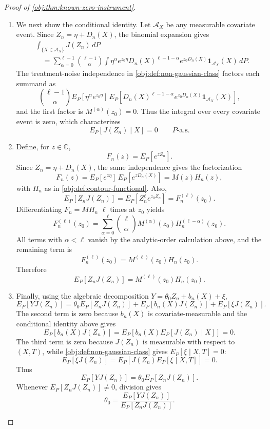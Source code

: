 \documentclass[11pt]{article}
\begin{document}
\begin{proof}[Proof of \cref{obj:thm:known-zero-instrument}]
\begin{enumerate}
\item We next show the conditional identity. Let \(\mathcal A_X\) be any measurable covariate event. Since \(Z_n=\eta+D_n(X)\), the binomial expansion gives
\[
\begin{aligned}
&\int_{\{X\in\mathcal A_X\}} J(Z_n)\,dP  \\
&\quad =
\sum_{\alpha=0}^{\ell-1}
\binom{\ell-1}{\alpha}
\int
\eta^\alpha e^{z_0\eta}
D_n(X)^{\ell-1-\alpha}e^{z_0D_n(X)}
\mathbf 1_{\mathcal A_X}(X)\,dP .
\end{aligned}
\]
The treatment-noise independence in \cref{obj:def:non-gaussian-class} factors each summand as
\[
\binom{\ell-1}{\alpha}
E_P\!\left[\eta^\alpha e^{z_0\eta}\right]\,
E_P\!\left[
D_n(X)^{\ell-1-\alpha}e^{z_0D_n(X)}
\mathbf 1_{\mathcal A_X}(X)
\right],
\]
and the first factor is \(M^{(\alpha)}(z_0)=0\). Thus the integral over every covariate event is zero, which characterizes
\[
E_P[J(Z_n)\mid X]=0
\qquad P\text{-a.s.}
\]

\item Define, for \(z\in\mathbb C\),
\[
F_n(z)=E_P[e^{zZ_n}].
\]
Since \(Z_n=\eta+D_n(X)\), the same independence gives the factorization
\[
F_n(z)=E_P[e^{z\eta}]\,E_P[e^{zD_n(X)}]=M(z)H_n(z),
\]
with \(H_n\) as in \cref{obj:def:contour-functional}. Also,
\[
E_P[Z_nJ(Z_n)]
=
E_P[Z_n^\ell e^{z_0Z_n}]
=
F_n^{(\ell)}(z_0).
\]
Differentiating \(F_n=MH_n\) \(\ell\) times at \(z_0\) yields
\[
F_n^{(\ell)}(z_0)
=
\sum_{\alpha=0}^{\ell}
\binom{\ell}{\alpha}
M^{(\alpha)}(z_0)H_n^{(\ell-\alpha)}(z_0).
\]
All terms with \(\alpha<\ell\) vanish by the analytic-order calculation above, and the remaining term is
\[
F_n^{(\ell)}(z_0)=M^{(\ell)}(z_0)H_n(z_0).
\]
Therefore
\[
E_P[Z_nJ(Z_n)]
=
M^{(\ell)}(z_0)H_n(z_0).
\]

\item Finally, using the algebraic decomposition \(Y=\theta_0Z_n+b_n(X)+\xi\),
\[
E_P[YJ(Z_n)]
=
\theta_0E_P[Z_nJ(Z_n)]
+
E_P[b_n(X)J(Z_n)]
+
E_P[\xi J(Z_n)] .
\]
The second term is zero because \(b_n(X)\) is covariate-measurable and the conditional identity above gives
\[
E_P[b_n(X)J(Z_n)]
=
E_P\!\left[b_n(X)E_P[J(Z_n)\mid X]\right]
=0 .
\]
The third term is zero because \(J(Z_n)\) is measurable with respect to \((X,T)\), while \cref{obj:def:non-gaussian-class} gives \(E_P[\xi\mid X,T]=0\):
\[
E_P[\xi J(Z_n)]
=
E_P\!\left[J(Z_n)E_P[\xi\mid X,T]\right]
=0 .
\]
Thus
\[
E_P[YJ(Z_n)]
=
\theta_0E_P[Z_nJ(Z_n)] .
\]
Whenever \(E_P[Z_nJ(Z_n)]\ne0\), division gives
\[
\theta_0
=
\frac{E_P[YJ(Z_n)]}{E_P[Z_nJ(Z_n)]}.
\]
\end{enumerate}
\end{proof}
\end{document}
